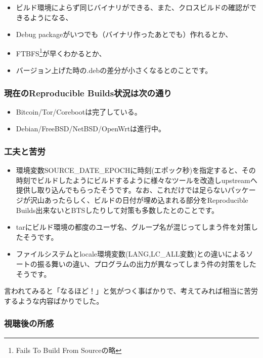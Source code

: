 \documentclass[mingoth,a4paper]{jsarticle}
\begin{document}
\begin{itemize}
 \item ビルド環境によらず同じバイナリができる、また、クロスビルドの確認ができるようになる、
 \item Debug packageがいつでも（バイナリ作ったあとでも）作れるとか、
 \item FTBFS\footnote{Fails To Build From Sourceの略}が早くわかるとか、
 \item バージョン上げた時の.debの差分が小さくなるとのことです。
 \end{itemize}

\subsubsection{現在のReproducible Builds状況は次の通り}

 \begin{itemize}
 \item Bitcoin/Tor/Corebootは完了している。
 \item Debian/FreeBSD/NetBSD/OpenWrtは進行中。
 \end{itemize}

\subsubsection{工夫と苦労}
 
\begin{itemize}
\item 環境変数SOURCE\_DATE\_EPOCHに時刻(エポック秒)を指定すると、その時刻でビルドしたようにビルドするように様々なツールを改造しupstreamへ提供し取り込んでもらったそうです。なお、これだけでは足らないパッケージが沢山あったらしく、ビルドの日付が埋め込まれる部分をReproducible Builds出来ないとBTSしたりして対策も多数したとのことです。
\item tarにビルド環境の都度のユーザ名、グループ名が混じってしまう件を対策したそうです。
\item ファイルシステムとlocale環境変数(LANG,LC\_ALL変数)との違いによるソートの振る舞いの違い、プログラムの出力が異なってしまう件の対策をしたそうです。
\end{itemize}

言われてみると「なるほど！」と気がつく事ばかりで、考えてみれば相当に苦労するような内容ばかりでした。

\subsubsection{視聴後の所感}
\end{document}
